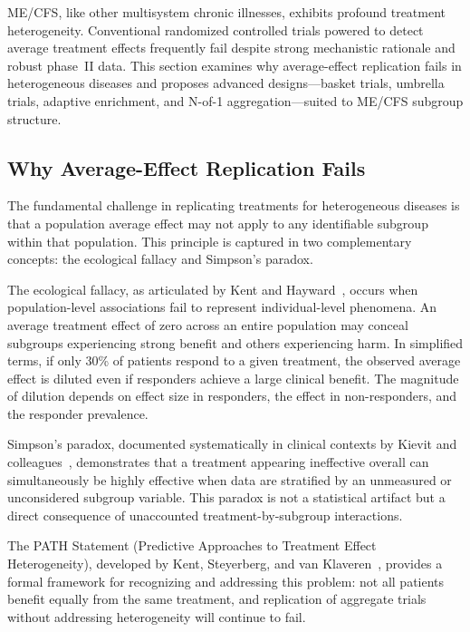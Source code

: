 ME/CFS, like other multisystem chronic illnesses, exhibits profound treatment heterogeneity. Conventional randomized controlled trials powered to detect average treatment effects frequently fail despite strong mechanistic rationale and robust phase~II data. This section examines why average-effect replication fails in heterogeneous diseases and proposes advanced designs---basket trials, umbrella trials, adaptive enrichment, and N-of-1 aggregation---suited to ME/CFS subgroup structure.

\subsection{Why Average-Effect Replication Fails}

The fundamental challenge in replicating treatments for heterogeneous diseases is that a population average effect may not apply to any identifiable subgroup within that population. This principle is captured in two complementary concepts: the ecological fallacy and Simpson's paradox.

The ecological fallacy, as articulated by Kent and Hayward~\cite{Kent2007}, occurs when population-level associations fail to represent individual-level phenomena. An average treatment effect of zero across an entire population may conceal subgroups experiencing strong benefit and others experiencing harm. In simplified terms, if only 30\% of patients respond to a given treatment, the observed average effect is diluted even if responders achieve a large clinical benefit. The magnitude of dilution depends on effect size in responders, the effect in non-responders, and the responder prevalence.

Simpson's paradox, documented systematically in clinical contexts by Kievit and colleagues~\cite{Kievit2013}, demonstrates that a treatment appearing ineffective overall can simultaneously be highly effective when data are stratified by an unmeasured or unconsidered subgroup variable. This paradox is not a statistical artifact but a direct consequence of unaccounted treatment-by-subgroup interactions.

The PATH Statement (Predictive Approaches to Treatment Effect Heterogeneity), developed by Kent, Steyerberg, and van Klaveren~\cite{Kent2020PATH}, provides a formal framework for recognizing and addressing this problem: not all patients benefit equally from the same treatment, and replication of aggregate trials without addressing heterogeneity will continue to fail.

